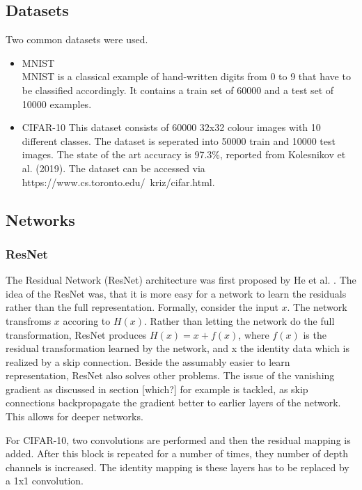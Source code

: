 \subsection{Datasets}
Two common datasets were used.
\begin{itemize}
    \item MNIST \\
    MNIST is a classical example of hand-written digits from 0 to 9 that have to
    be classified accordingly. It contains a train set of 60000 and a test set
    of 10000 examples.
    \item CIFAR-10
    This dataset consists of 60000 32x32 colour images with 10 different
    classes. The dataset is seperated into 50000 train and 10000 test images.
    The state of the art accuracy is 97.3\%, reported from Kolesnikov et al.
    (2019). The dataset can be accessed via https://www.cs.toronto.edu/~kriz/cifar.html.
\end{itemize}
\subsection{Networks}
\subsubsection{ResNet}
The Residual Network (ResNet) architecture was first proposed by He et al.
\cite{he2016deep}. The idea of the ResNet was, that it is more easy for a
network to learn the residuals rather than the full representation. Formally,
consider the input $x$. The network transfroms $x$ accoring to $H(x)$. Rather
than letting the network do the full transformation, ResNet produces $H(x)= x
+f(x)$, where $f(x)$ is the residual transformation learned by the network, and
x the identity data which is realized by a skip connection. Beside the assumably
easier to learn representation, ResNet also solves other problems. The issue of
the vanishing gradient as discussed in section [which?] for example is tackled,
as skip connections backpropagate the gradient better to earlier layers of the
network. This allows for deeper networks.

For CIFAR-10, two convolutions are performed and then the residual mapping is
added. After this block is repeated for a number of times, they number of depth
channels is increased. The identity mapping is these layers has to be replaced
by a 1x1 convolution.


